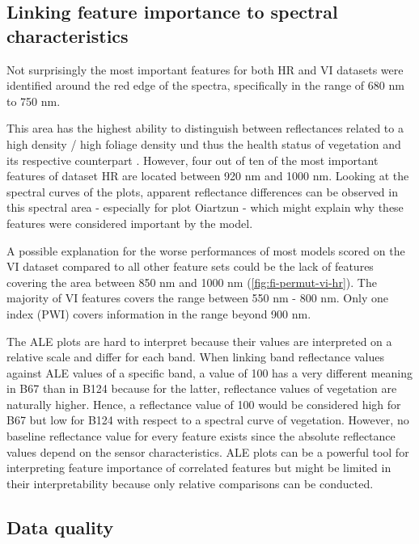 \documentclass[letterpaper, peerreview, draftcls]{IEEEtran}
\begin{document}
\subsection{Linking feature importance to spectral characteristics}

Not surprisingly the most important features for both HR and VI datasets were identified around the red edge of the spectra, specifically in the range of 680 nm to 750 nm.

This area has the highest ability to distinguish between reflectances related to a high density / high foliage density und thus the health status of vegetation and its respective counterpart \cite{horler1983}.
However, four out of ten of the most important features of dataset HR are located between 920 nm and 1000 nm.
Looking at the spectral curves of the plots, apparent reflectance differences can be observed in this spectral area - especially for plot Oiartzun - which might explain why these features were considered important by the model.

A possible explanation for the worse performances of most models scored on the VI dataset compared to all other feature sets could be the lack of features covering the area between 850 nm and 1000 nm (\autoref{fig:fi-permut-vi-hr}).
The majority of VI features covers the range between 550 nm - 800 nm.
Only one index (PWI) covers information in the range beyond 900 nm.

The ALE plots are hard to interpret because their values are interpreted on a relative scale and differ for each band.
When linking band reflectance values against ALE values of a specific band, a value of 100 has a very different meaning in B67 than in B124 because for the latter, reflectance values of vegetation are naturally higher.
Hence, a reflectance value of 100 would be considered high for B67 but low for B124 with respect to a spectral curve of vegetation.
However, no baseline reflectance value for every feature exists since the absolute reflectance values depend on the sensor characteristics.
ALE plots can be a powerful tool for interpreting feature importance of correlated features but might be limited in their interpretability because only relative comparisons can be conducted.

\subsection{Data quality}
\end{document}
